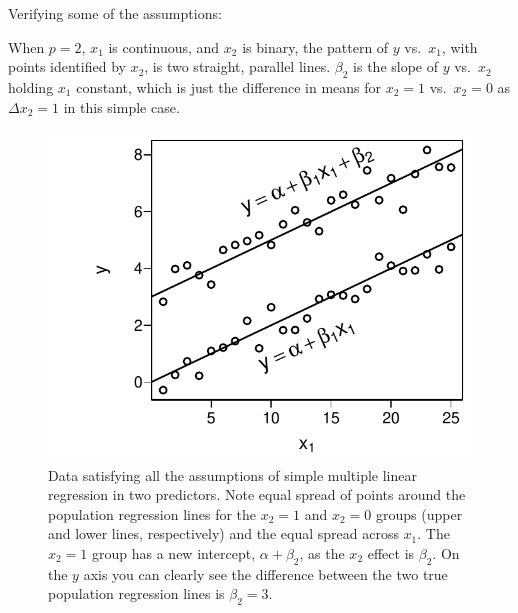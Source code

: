 Verifying some of the assumptions:
\be
\item   When $p=2$, $x_{1}$ is continuous, and $x_{2}$ is binary, the
        pattern of $y$ vs.\ $x_{1}$, with points identified by
        $x_{2}$, is two straight, parallel lines.  $\beta_{2}$ is the
        slope of $y$ vs.\ $x_{2}$ holding $x_{1}$ constant, which is
        just the difference in means for $x_{2}=1$ vs.\ $x_{2}=0$ as
        $\Delta x_{2}=1$ in this simple case.
\begin{Schunk}
\begin{figure}[htbp]

\centerline{\includegraphics[width=\maxwidth]{reg-mult-reg-assume-twovar-1} }

\caption[Assumptions for two predictors]{Data satisfying all the assumptions of simple multiple linear regression in two predictors.  Note equal spread of points around the population regression lines for the $x_{2}=1$ and $x_{2}=0$ groups (upper and lower lines, respectively) and the equal spread across $x_1$.  The $x_{2}=1$ group has a new intercept, $\alpha+\beta_2$, as the $x_2$ effect is $\beta_2$.  On the $y$ axis you can clearly see the difference between the two true population regression lines is $\beta_{2} = 3$.}\label{fig:reg-mult-reg-assume-twovar}
\end{figure}
\end{Schunk}
